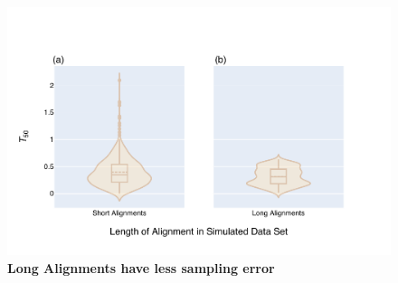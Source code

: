\begin{figure}[!ht]
\centering
\includegraphics[width=\textwidth]{figures/plots/synthetic/T50/197113_332182_17210-seq_len.pdf}
\caption{\textbf{Long Alignments have less sampling error}}
\label{fig:T50-short_long}
\end{figure}